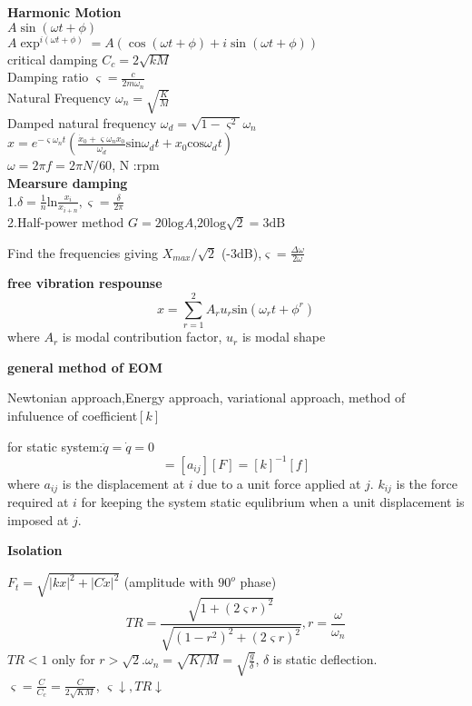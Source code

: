 \documentclass{article}
\begin{document}
\thispagestyle{empty}
\begin{multicols*}{3}

  \noindent\textbf{Harmonic Motion}\\
  $A \sin(\omega t + \phi)$\\
  $A \exp^{i(\omega t + \phi)} = A(\cos(\omega t + \phi) + i\sin(\omega t + \phi))$\\
  critical damping $C_{c}=2\sqrt{kM}$\\
  Damping ratio $\varsigma=\frac{c}{2m\omega_{n}}$\\
  Natural Frequency $\omega_{n}=\sqrt{\frac{K}{M}}$\\
  Damped natural frequency $\omega_{d}=\sqrt{1-\varsigma^{2}}\omega_{n}$\\
  $x=e^{-\varsigma \omega_{n}t}(\frac{\dot{x}_{0}+\varsigma \omega_{n}x_{0}}{\omega_{d}}\text{sin}\omega_{d}t+x_{0}\text{cos}\omega_{d}t)$\\
  $\omega=2\pi f=2\pi N/60$, N :rpm\\

\noindent\textbf{Mearsure damping}\\
1.$\delta=\frac{1}{n}\text{ln}\frac{x_{i}}{x_{i+n}}, \varsigma =\frac{\delta}{2\pi}$\\
2.Half-power method $G=20\text{log}A$,$20\text{log}\sqrt{2}=3\text{dB}$

Find the frequencies giving $X_{max}/\sqrt{2}$ (-3dB),$\varsigma =\frac{\Delta \omega}{2\omega}$

\textbf{free vibration respounse}
\begin{equation*}
  {x}=\sum_{r=1}^{2}A_{r}u_{r}\text{sin}(\omega_{r}t+\phi^{r})
\end{equation*}
where $A_{r}$ is modal contribution factor, $u_{r}$ is modal shape

\textbf{general method of EOM}

Newtonian approach,Energy approach, variational approach,
method of infuluence of coefficient$[k]$

for static system:$\ddot{q}=\dot{q}=0$
\begin{equation*}
  [q]=[a_{ij}][F]=[k]^{-1}[f]
\end{equation*}
where $a_{ij}$ is the displacement at $i$ due to a unit force applied at $j$.
$k_{ij}$ is the force required at $i$ for keeping the system static equlibrium when a unit displacement is imposed at $j$.

\textbf{Isolation}

$F_{t}=\sqrt{|kx|^{2}+|C\dot{x}|^{2}}$ (amplitude with $90^{o}$ phase)
\begin{equation*}
  TR=\frac{\sqrt{1+(2\varsigma r)^{2}}}{\sqrt{(1-r^{2})^{2}+(2\varsigma r)^{2}}}, r=\frac{\omega}{\omega_{n}}
\end{equation*}
$TR<1$ only for $r> \sqrt{2}$.$\omega_{n}=\sqrt{K/M}=\sqrt{\frac{g}{\delta}}$, $\delta$ is static deflection.
$\varsigma=\frac{C}{C_{c}}=\frac{C}{2\sqrt{KM}}$, $\varsigma \downarrow, TR \downarrow$


\end{multicols*}
\end{document}
